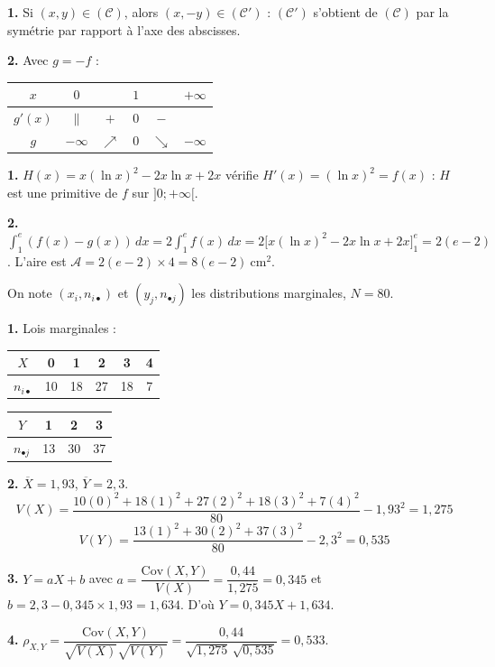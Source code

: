 \documentclass[11pt]{article}
\begin{document}
\textbf{1.} Si $(x, y) \in (\mathcal{C})$, alors $(x, -y) \in (\mathcal{C}')$ : $(\mathcal{C}')$ s'obtient de $(\mathcal{C})$ par la symétrie par rapport à l'axe des abscisses.

\textbf{2.} Avec $g = -f$ :
\begin{center}\renewcommand{\arraystretch}{1.4}
\begin{tabular}{|c|ccccc|}
\hline $x$ & $0$ & & $1$ & & $+\infty$ \\\hline $g'(x)$ & $\|$ & $+$ & $0$ & $-$ & \\\hline $g$ & $-\infty$ & $\nearrow$ & $0$ & $\searrow$ & $-\infty$ \\\hline
\end{tabular}
\end{center}

\textbf{1.} $H(x) = x(\ln x)^2 - 2x\ln x + 2x$ vérifie $H'(x) = (\ln x)^2 = f(x)$ : $H$ est une primitive de $f$ sur $]0;+\infty[$.

\textbf{2.} $\displaystyle\int_1^e (f(x) - g(x))\,dx = 2\int_1^e f(x)\,dx = 2\big[x(\ln x)^2 - 2x\ln x + 2x\big]_1^e = 2(e - 2)$. L'aire est $\mathcal{A} = 2(e-2)\times 4 = 8(e - 2)\ \text{cm}^2$.

On note $(x_i, n_{i\bullet})$ et $(y_j, n_{\bullet j})$ les distributions marginales, $N = 80$.

\textbf{1.} Lois marginales :
\begin{center}\renewcommand{\arraystretch}{1.3}
\begin{tabular}{|c|c|c|c|c|c|}\hline $X$ & 0 & 1 & 2 & 3 & 4 \\\hline $n_{i\bullet}$ & 10 & 18 & 27 & 18 & 7 \\\hline\end{tabular}\qquad
\begin{tabular}{|c|c|c|c|}\hline $Y$ & 1 & 2 & 3 \\\hline $n_{\bullet j}$ & 13 & 30 & 37 \\\hline\end{tabular}
\end{center}

\textbf{2.} $\overline{X} = 1{,}93$, $\overline{Y} = 2{,}3$.
\[ V(X) = \frac{10(0)^2 + 18(1)^2 + 27(2)^2 + 18(3)^2 + 7(4)^2}{80} - 1{,}93^2 = 1{,}275 \]
\[ V(Y) = \frac{13(1)^2 + 30(2)^2 + 37(3)^2}{80} - 2{,}3^2 = 0{,}535 \]

\textbf{3.} $Y = aX + b$ avec $a = \dfrac{\mathrm{Cov}(X,Y)}{V(X)} = \dfrac{0{,}44}{1{,}275} = 0{,}345$ et $b = 2{,}3 - 0{,}345\times 1{,}93 = 1{,}634$. D'où $Y = 0{,}345X + 1{,}634$.

\textbf{4.} $\rho_{X,Y} = \dfrac{\mathrm{Cov}(X,Y)}{\sqrt{V(X)}\sqrt{V(Y)}} = \dfrac{0{,}44}{\sqrt{1{,}275}\,\sqrt{0{,}535}} = 0{,}533$.
\end{document}
